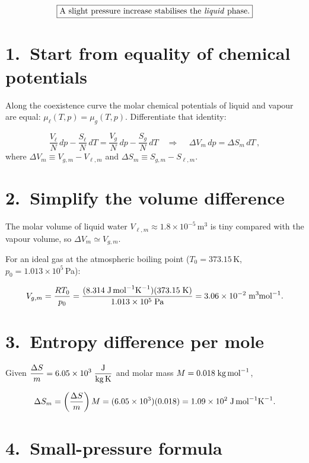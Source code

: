 \documentclass[12pt]{article}
\theoremstyle{definition} %
\theoremstyle{plain} %
\begin{document}
\[
\boxed{\text{A slight pressure increase stabilises the \emph{liquid}
phase.}}
\]

\section*{1.\  Start from equality of chemical potentials}

Along the coexistence curve the molar chemical potentials of liquid
and vapour are equal: $\mu_{\ell}(T,p)=\mu_{g}(T,p)$.  
Differentiate that identity:

\[
\frac{V_{\ell}}{N}\,dp-\frac{S_{\ell}}{N}\,dT
  =\frac{V_{g}}{N}\,dp-\frac{S_{g}}{N}\,dT
\quad\Longrightarrow\quad
\boxed{\,\Delta V_m\,dp = \Delta S_m\,dT\,},
\]
where $\Delta V_m\!\equiv V_{g,m}-V_{\ell,m}$ and
$\Delta S_m\!\equiv S_{g,m}-S_{\ell,m}$.

\section*{2.\  Simplify the volume difference}

The molar volume of liquid water
$V_{\ell,m}\approx\!1.8\times10^{-5}\,\text{m}^3$  
is tiny compared with the vapour volume, so  
$\Delta V_m\simeq V_{g,m}$.

For an ideal gas at the atmospheric boiling point
($T_0 = 373.15\,$K,\; $p_0 = 1.013\times10^{5}\,$Pa):

\[
V_{g,m}
  = \frac{RT_0}{p_0}
  = \frac{(8.314\;\text{J\,mol}^{-1}\text{K}^{-1})(373.15\;\text{K})}
         {1.013\times10^{5}\;\text{Pa}}
  = 3.06\times10^{-2}\;\text{m}^{3}\!\!\;\text{mol}^{-1}.
\]

\section*{3.\  Entropy difference per mole}

Given $\displaystyle
\frac{\Delta S}{m}=6.05\times10^{3}\;\frac{\text{J}}{\text{kg\,K}}$  
and molar mass $M=0.018\;\text{kg\,mol}^{-1}$,

\[
\Delta S_m = \left(\frac{\Delta S}{m}\right) M
            = (6.05\times10^{3})(0.018)
            = 1.09\times10^{2}\;\text{J\,mol}^{-1}\text{K}^{-1}.
\]

\section*{4.\  Small-pressure formula}
\end{document}
